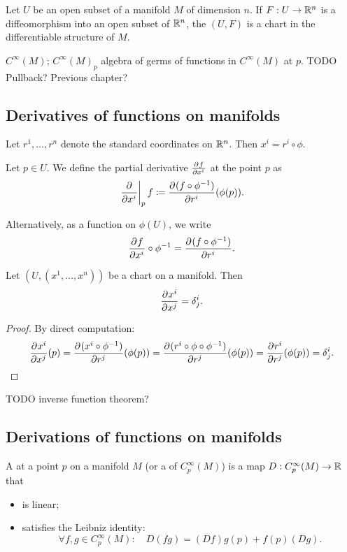 \begin{lemma}
Let $U$ be an open subset of a manifold $M$ of dimension $n$. If $F: U\to \mathbb{R}^n$ is a diffeomorphism into an open subset of $\mathbb{R}^n$, the $(U,F)$ is a chart in the differentiable structure of $M$.
\end{lemma}


$C^\infty(M)$; $C^\infty(M)_p$ algebra of germs of functions in $C^\infty(M)$ at $p$.
TODO Pullback? Previous chapter?

\subsection{Derivatives of functions on manifolds}
Let $r^1,\ldots,r^n$ denote the standard coordinates on $\mathbb{R}^n$. Then $x^i = r^i\circ \phi$.
\begin{definition}
Let $p\in U$. We define the partial derivative $ \frac{\partial{^{}}f}{\partial{{{x^i}}^{}}} $ at the point $p$ as
\[ \left. \frac{\partial{^{}}}{\partial{{x^i}^{}}} \right|_p f \coloneqq  \frac{\partial{^{}}(f\circ\phi^{-1})}{\partial{{r^i}^{}}} (\phi(p)). \]
\end{definition}
Alternatively, as a function on $\phi(U)$, we write
\[  \frac{\partial{^{}}f}{\partial{{x^i}^{}}} \circ\phi^{-1} =  \frac{\partial{^{}}(f\circ\phi^{-1})}{\partial{{r^i}^{}}} . \]

\begin{proposition}
Let $(U,(x^1,\ldots, x^n))$ be a chart on a manifold. Then
\[  \frac{\partial{^{}}x^i}{\partial{{x^j}^{}}}  = \delta^i_j. \]
\end{proposition}
\begin{proof}
By direct computation:
\[  \frac{\partial{^{}}x^i}{\partial{{x^j}^{}}} (p) =  \frac{\partial{^{}}(x^i\circ\phi^{-1})}{\partial{{r^j}^{}}} (\phi(p)) =  \frac{\partial{^{}}(r^i\circ \phi\circ\phi^{-1})}{\partial{{r^j}^{}}} (\phi(p)) =  \frac{\partial{^{}}r^i}{\partial{{r^j}^{}}} (\phi(p)) = \delta^i_j. \]
\end{proof}

TODO inverse function theorem?

\subsection{Derivations of functions on manifolds}
\begin{definition}
A  at a point $p$ on a manifold $M$ (or a  of $C^\infty_p(M)$) is a map $D:C^\infty_p(M)\to \mathbb{R}$ that
\begin{itemize}
\item is linear;
\item satisfies the Leibniz identity:
\[ \forall f,g\in C^\infty_p(M): \quad D(fg) = (Df)g(p) + f(p)(Dg). \]
\end{itemize}
\end{definition}


